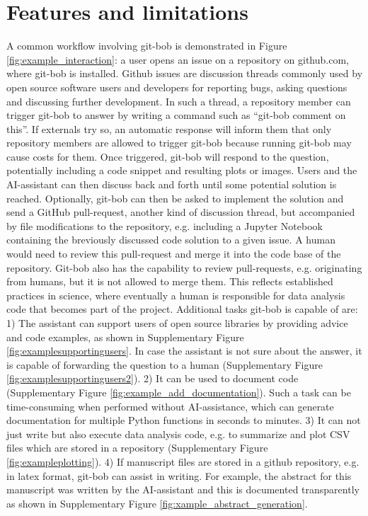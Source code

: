 \documentclass[times, twoside]{zHenriquesLab-StyleBioRxiv}
\begin{document}

\section*{Features and limitations}

A common workflow involving git-bob is demonstrated in Figure \ref{fig:example_interaction}: a user opens an issue on a repository on github.com, where git-bob is installed. Github issues are discussion threads commonly used by open source software users and developers for reporting bugs, asking questions and discussing further development. In such a thread, a repository member can trigger git-bob to answer by writing a command such as ``git-bob comment on this''. If externals try so, an automatic response will inform them that only repository members are allowed to trigger git-bob because running git-bob may cause costs for them. Once triggered, git-bob will respond to the question, potentially including a code snippet and resulting plots or images. Users and the AI-assistant can then discuss back and forth until some potential solution is reached. Optionally, git-bob can then be asked to implement the solution and send a GitHub pull-request, another kind of discussion thread, but accompanied by file modifications to the repository, e.g. including a Jupyter Notebook containing the breviously discussed code solution to a given issue. A human would need to review this pull-request and merge it into the code base of the repository. Git-bob also has the capability to review pull-requests, e.g. originating from humans, but it is not allowed to merge them. This reflects established practices in science, where eventually a human is responsible for data analysis code that becomes part of the project. Additional tasks git-bob is capable of are: 1) The assistant can support users of open source libraries by providing advice and code examples, as shown in Supplementary Figure \ref{fig:examplesupportingusers}. In case the assistant is not sure about the answer, it is capable of forwarding the question to a human (Supplementary Figure \ref{fig:examplesupportingusers2}). 2) It can be used to document code (Supplementary Figure \ref{fig:example_add_documentation}). Such a task can be time-consuming when performed without AI-assistance, which can generate documentation for multiple Python functions in seconds to minutes. 3) It can not just write but also execute data analysis code, e.g. to summarize and plot CSV files which are stored in a repository (Supplementary Figure \ref{fig:exampleplotting}). 4) If manuscript files are stored in a github repository, e.g. in latex format, git-bob can assist in writing. For example, the abstract for this manuscript was written by the AI-assistant and this is documented transparently as shown in Supplementary Figure \ref{fig:xample_abstract_generation}.
\end{document}
